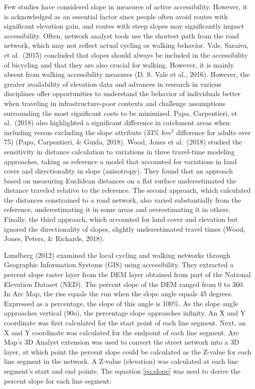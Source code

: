 \documentclass[
11pt, %
oneside, %
english, %
singlespacing, %
]{macthesis} %
\begin{document}
Few studies have considered slope in measures of active accessibility. However, it is acknowledged as an essential factor since people often avoid routes with significant elevation gain, and routes with steep slopes may significantly impact accessibility. Often, network analyst tools use the shortest path from the road network, which may not reflect actual cycling or walking behavior. Vale, Saraiva, et al.~(2015) concluded that slopes should always be included in the accessibility of bicycling and that they are also crucial for walking. However, it is mainly absent from walking accessibility measures (D. S. Vale et al., 2016). However, the greater availability of elevation data and advances in research in various disciplines offer opportunities to understand the behavior of individuals better when traveling in infrastructure-poor contexts and challenge assumptions surrounding the most significant costs to be minimized. Papa, Carpentieri, et al.~(2018) also highlighted a significant difference in catchment areas when including versus excluding the slope attribute (33\% \(km^2\) difference for adults over 75) (Papa, Carpentieri, \& Guida, 2018). Wood, Jones et al.~(2018) studied the sensitivity in distance calculation to variations in three travel-time modeling approaches, taking as reference a model that accounted for variations in land cover and directionality in slope (anisotropy). They found that an approach based on measuring Euclidean distances on a flat surface underestimated the distance traveled relative to the reference. The second approach, which calculated the distances constrained to a road network, also varied substantially from the reference, underestimating it in some areas and overestimating it in others. Finally, the third approach, which accounted for land cover and elevation but ignored the directionality of slopes, slightly underestimated travel times (Wood, Jones, Peters, \& Richards, 2018).

Lundberg (2012) examined the local cycling and walking networks through Geographic Information Systems (GIS) using accessibility. They extracted a percent slope raster layer from the DEM layer obtained from part of the National Elevation Dataset (NED). The percent slope of the DEM ranged from 0 to 360. In Arc Map, the rise equals the run when the slope angle equals 45 degrees. Expressed as a percentage, the slope of this angle is 100\%. As the slope angle approaches vertical (90o), the percentage slope approaches infinity. An X and Y coordinate was first calculated for the start point of each line segment. Next, an X and Y coordinate was calculated for the endpoint of each line segment. Arc Map's 3D Analyst extension was used to convert the street network into a 3D layer, at which point the percent slope could be calculated as the Z-value for each line segment in the network. A Z-value (elevation) was calculated at each line segment's start and end points. The equation \ref{eq:slope} was used to derive the percent slope for each line segment:
\end{document}
